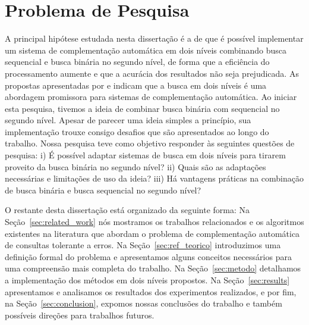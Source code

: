 \section{Problema de Pesquisa}
\label{sec:research-problem}
A principal hipótese estudada nesta dissertação é a de que é possível implementar um sistema de complementação automática em dois níveis combinando busca sequencial e busca binária no segundo nível, de forma que a eficiência do processamento aumente e que a acurácia dos resultados não seja prejudicada. As propostas apresentadas por \cite{xavier2019} e \cite{berg2020} indicam que a busca em dois níveis é uma abordagem promissora para sistemas de complementação automática. Ao iniciar esta pesquisa, tivemos a ideia de combinar busca binária com sequencial no segundo nível. Apesar de parecer uma ideia simples a princípio, sua implementação trouxe consigo desafios que são apresentados ao longo do trabalho. Nossa pesquisa teve como objetivo responder às seguintes questões de pesquisa: i) É possível adaptar sistemas de busca em dois níveis para tirarem proveito da busca binária no segundo nível? ii) Quais são as adaptações necessárias e limitações de uso da ideia? iii) Há vantagens práticas na combinação de busca binária e busca sequencial no segundo nível?


O restante desta dissertação está organizado da seguinte forma: Na Seção~\ref{sec:related_work} nós mostramos os trabalhos relacionados e os algoritmos existentes na literatura que abordam o problema de complementação automática de consultas tolerante a erros. Na Seção~\ref{sec:ref_teorico} introduzimos uma definição formal do problema e apresentamos alguns conceitos necessários para uma compreensão mais completa do trabalho. Na Seção~\ref{sec:metodo} detalhamos a implementação dos métodos em dois níveis propostos. Na Seção~\ref{sec:results} apresentamos e analisamos os resultados dos experimentos realizados, e por fim, na Seção~\ref{sec:conclusion}, expomos nossas conclusões do trabalho e também possíveis direções para trabalhos futuros.
